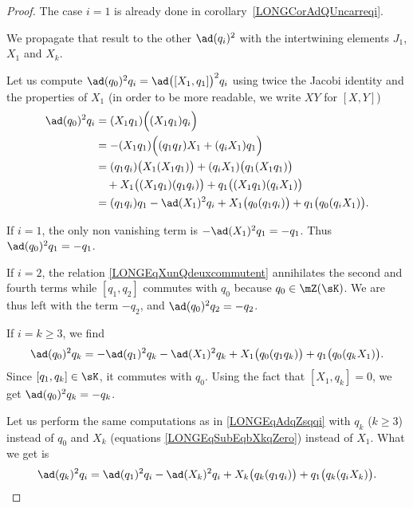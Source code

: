 \begin{proof}
	The case $i=1$ is already done in corollary~\ref{LONGCorAdQUncarreqi}.

	We propagate that result to the other $\ad(q_i)^2$ with the intertwining elements $J_1$, $X_1$ and $X_k$.

	Let us compute $\ad(q_0)^2q_i=\ad\big([X_1,q_1]\big)^2q_i$ using twice the Jacobi identity and the properties of $X_1$ (in order to be more readable, we write $XY$ for $[X,Y]$)
	\begin{equation}		\label{LONGEqAdqZsqqi}
		\begin{aligned}[]
			\ad(q_0)^2q_i & =	(X_1q_1)\Big( (X_1q_1)q_i \Big)                                                 \\
			              & =	-(X_1q_1)\Big( (q_1q_I)X_1+(q_iX_1)q_1 \Big)                                    \\
			              & =(q_1q_i)\big( X_1(X_1q_1) \big)+(q_iX_1)\big( q_1(X_1q_1) \big)                  \\
			              & \quad + X_1\big( (X_1q_1)(q_1q_i) \big)+q_1\big( (X_1q_1)(q_iX_1) \big)           \\
			              & =(q_1q_i)q_1-\ad(X_1)^2q_i+X_1\big( q_0(q_1q_i) \big)+q_1\big( q_0(q_iX_1) \big).
		\end{aligned}
	\end{equation}

	If $i=1$, the only non vanishing term is $-\ad(X_1)^2q_1=-q_1$.  Thus $\ad(q_0)^2q_1=-q_1$.

	If $i=2$, the relation \eqref{LONGEqXunQdeuxcommutent} annihilates the second and fourth terms while $[q_1,q_2]$ commutes with $q_0$ because $q_0\in\mZ(\sK)$. We are thus left with the term $-q_2$, and $\ad(q_0)^2q_2=-q_2$.

	If $i=k\geq 3$, we find
	\begin{equation}
		\ad(q_0)^2q_k=-\ad(q_1)^2q_k-\ad(X_1)^2q_k+X_1\big( q_0(q_1q_k) \big)+q_1\big( q_0(q_kX_1) \big).
	\end{equation}
	Since $[q_1,q_k]\in\sK$, it commutes with $q_0$. Using the fact that $[X_1,q_k]=0$, we get $\ad(q_0)^2q_k=-q_k$.

	Let us perform the same computations  as in \eqref{LONGEqAdqZsqqi} with $q_k$ ($k\geq 3$) instead of $q_0$ and $X_k$ (equations \eqref{LONGEqSubEqbXkqZero}) instead of $X_1$. What we get is
	\begin{equation}
		\ad(q_k)^2q_i=\ad(q_1)^2q_i-\ad(X_k)^2q_i+X_k\big( q_k(q_1q_i) \big)+q_1\big( q_k(q_iX_k) \big).
	\end{equation}


\end{proof}
